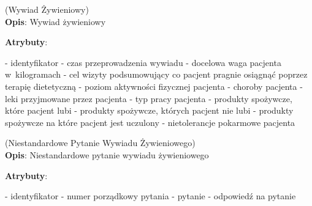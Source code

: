 \begin{enumerate}[label={\textbf{KAT/3/\protect\twodigits{\theenumi}}}, wide, labelwidth=!, labelindent=0pt, labelsep=0pt, series=reqs]
    \label{kat:NutritionalInterview} (Wywiad Żywieniowy)\\
    \indent\textbf{Opis}: Wywiad żywieniowy
    \par
    \textbf{Atrybuty}:
    \begin{itemize}[series=atr, wide, align=left, leftmargin=190pt]
        \label{kat:NutritionalInterview:id}- identyfikator
        \label{kat:NutritionalInterview:completionDate}- czas przeprowadzenia wywiadu
        \label{kat:NutritionalInterview:targetWeight}- docelowa waga pacjenta w~kilogramach
        \label{kat:NutritionalInterview:advicePurpose}- cel wizyty podsumowujący co pacjent pragnie osiągnąć poprzez terapię dietetyczną
        \label{kat:NutritionalInterview:physicalActivity}- poziom aktywności fizycznej pacjenta
        \label{kat:NutritionalInterview:diseases}- choroby pacjenta
        \label{kat:NutritionalInterview:medicines}- leki przyjmowane przez pacjenta
        \label{kat:NutritionalInterview:jobType}- typ pracy pacjenta
        \label{kat:NutritionalInterview:likedProducts}- produkty spożywcze, które pacjent lubi
        \label{kat:NutritionalInterview:dislikedProducts}- produkty spożywcze, których pacjent nie lubi
        \label{kat:NutritionalInterview:foodAllergies}- produkty spożywcze na które pacjent jest uczulony
        \label{kat:NutritionalInterview:foodIntolerances}- nietolerancje pokarmowe pacjenta
    \end{itemize}

    \label{kat:CustomNutritionalInterviewQuestion} (Niestandardowe Pytanie Wywiadu Żywieniowego)\\
    \indent\textbf{Opis}: Niestandardowe pytanie wywiadu żywieniowego
    \par
    \textbf{Atrybuty}:
    \begin{itemize}[series=atr, wide, align=left, leftmargin=190pt]
        \label{kat:CustomNutritionalInterviewQuestion:id}- identyfikator
        \label{kat:CustomNutritionalInterviewQuestion:ordinalNumber}- numer porządkowy pytania
        \label{kat:CustomNutritionalInterviewQuestion:question}- pytanie
        \label{kat:CustomNutritionalInterviewQuestion:answer}- odpowiedź na pytanie
    \end{itemize}


\end{enumerate}
